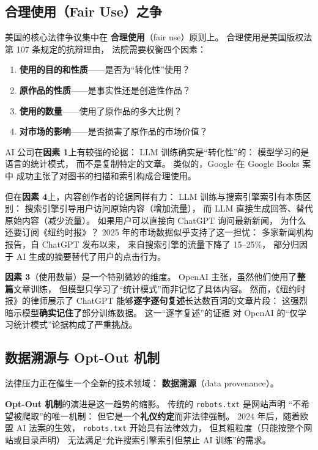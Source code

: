 \subsection{合理使用（Fair Use）之争}

美国的核心法律争议集中在
\textbf{合理使用}（fair use）原则上。
合理使用是美国版权法第 107 条规定的抗辩理由，
法院需要权衡四个因素：
\begin{enumerate}[noitemsep]
  \item \textbf{使用的目的和性质}——是否为“转化性”使用？
  \item \textbf{原作品的性质}——是事实性还是创造性作品？
  \item \textbf{使用的数量}——使用了原作品的多大比例？
  \item \textbf{对市场的影响}——是否损害了原作品的市场价值？
\end{enumerate}

AI 公司在\textbf{因素 1}上有较强的论据：
LLM 训练确实是“转化性”的：
模型学习的是语言的统计模式，
而不是复制特定的文章。
类似的，Google 在 Google Books 案中
成功主张了对图书的扫描和索引构成合理使用。

但在\textbf{因素 4}上，内容创作者的论据同样有力：
LLM 训练与搜索引擎索引有本质区别：
搜索引擎引导用户访问原始内容（增加流量），
而 LLM 直接生成回答、替代原始内容（减少流量）。
如果用户可以直接向 ChatGPT 询问最新新闻，
为什么还要订阅《纽约时报》？
2025 年的市场数据似乎支持了这一担忧：
多家新闻机构报告，自 ChatGPT 发布以来，
来自搜索引擎的流量下降了 15--25\%，
部分归因于 AI 生成的摘要替代了用户的点击行为。

\textbf{因素 3}（使用数量）是一个特别微妙的维度。
OpenAI 主张，虽然他们使用了\textbf{整篇}文章训练，
但模型只学习了“统计模式”而非记忆了具体内容。
然而，《纽约时报》的律师展示了
ChatGPT 能够\textbf{逐字逐句复述}长达数百词的文章片段：
这强烈暗示模型\textbf{确实记住了}部分训练数据。
这一“逐字复述”的证据
对 OpenAI 的“仅学习统计模式”论据构成了严重挑战。

\subsection{数据溯源与 Opt-Out 机制}

法律压力正在催生一个全新的技术领域：
\textbf{数据溯源}（data provenance）。

\textbf{Opt-Out 机制}的演进是这一趋势的缩影。
传统的 \texttt{robots.txt} 是网站声明
“不希望被爬取”的唯一机制：
但它是一个\textbf{礼仪约定}而非法律强制。
2024 年后，随着欧盟 AI 法案的生效，
\texttt{robots.txt} 开始具有法律效力，
但其粗粒度（只能按整个网站或目录声明）
无法满足“允许搜索引擎索引但禁止 AI 训练”的需求。


